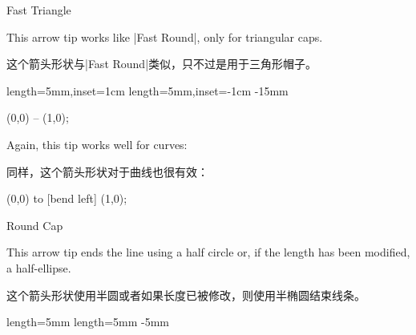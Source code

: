 \begin{arrowcap}{Fast Triangle}{
    This arrow tip works like |Fast Round|, only for triangular caps.

    这个箭头形状与|Fast Round|类似，只不过是用于三角形帽子。
}%
{length=5mm,inset=1cm}%
{length=5mm,inset=-1cm}%
{-15mm}

\begin{codeexample}[preamble={\usetikzlibrary{arrows.meta}}]
\tikz \draw [line width=1ex,
             -{Triangle Cap []. Fast Triangle[] Fast Triangle[]}]
  (0,0) -- (1,0);
\end{codeexample}
    Again, this tip works well for curves:

    同样，这个箭头形状对于曲线也很有效：
\begin{codeexample}[preamble={\usetikzlibrary{arrows.meta,bending}}]
\tikz [f/.tip = Fast Triangle] %
  \draw [line width=1ex, -{[bend] Triangle Cap[] . f f f}]
  (0,0) to [bend left] (1,0);
\end{codeexample}

    \begin{arrowcapexamples}
        \arrowcapexample[]
        \arrowcapexample[reversed]
        \arrowcapexample[cap angle=60]
        \arrowcapexample[cap angle=60,inset=5pt]
        \arrowcapexample[length=.5ex]
        \arrowcapexample[slant=.3]
    \end{arrowcapexamples}
\end{arrowcap}


\begin{arrowcap}{Round Cap}{
    This arrow tip ends the line using a half circle or, if the length has been
    modified, a half-ellipse.

    这个箭头形状使用半圆或者如果长度已被修改，则使用半椭圆结束线条。
  }%
{length=5mm}%
{length=5mm}%
{-5mm}

    \begin{arrowcapexamples}
        \arrowcapexample[]
        \arrowcapexample[reversed]
        \arrowcapexample[length=.5ex]
        \arrowcapexample[slant=.3]
    \end{arrowcapexamples}
\end{arrowcap}


